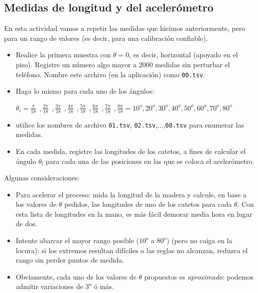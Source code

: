\documentclass[10pt,a4paper]{article}
\theoremstyle{definition}
\begin{document}
\subsection{Medidas de longitud y del acelerómetro}
En esta actividad vamos a repetir las medidas que hicimos anteriormente, pero para un rango de valores (es decir, para una calibración confiable).

\begin{itemize}
\item[a)] Realice la primera muestra con $\theta =0$, es decir, horizontal (apoyado en el piso). Registre un número algo mayor a 2000 medidas sin perturbar el teléfono. Nombre este archivo (en la aplicación) como \texttt{00.tsv}. 

\item[b)] Haga lo mismo para cada uno de los ángulos:

$\theta_i = \frac{\pi}{18} \;\,  , \frac{2\pi}{18} \;\, , \frac{3\pi}{18} \;\, , \frac{4\pi}{18} \;\, , \frac{5\pi}{18} \;\, , \frac{6\pi}{18} \;\, , \frac{7\pi}{18} \;\, , \frac{8\pi}{18} = 10^o, 20^o,30^o,40^o,50^o,60^o,70^o,80^o$

\vspace{2mm}

\item[c)]utilice los nombres de archivo \texttt{01.tsv}, \texttt{02.tsv},...,\texttt{08.tsv} para enumerar las medidas.

\item[d)] En cada medida, registre las longitudes de los catetos, a fines de calcular el ángulo $\theta_{l}$ para cada una de las posiciones en las que se coloca el acelerómetro.
\end{itemize}




 Algunas consideraciones:
 
\begin{itemize}
\item[$\bullet$] Para acelerar el proceso: mida la longitud de la madera y calcule, en base a los valores de $\theta$ pedidos, las longitudes de uno de los catetos para cada $\theta$. Con esta lista de longitudes en la mano, es más fácil demorar media hora en lugar de dos.
\item[$\bullet$] Intente abarcar el mayor rango posible ($10^o$ a $80^o$) (pero no caiga en la locura): si los extremos resultan difíciles o las reglas no alcanzan, reduzca el rango sin perder puntos de medida.
\item[$\bullet$] Obviamente, cada uno de los valores de $\theta$ propuestos es \textit{aproximado}: podemos admitir variaciones de $3^o$ ó más.
\end{itemize}
\end{document}
